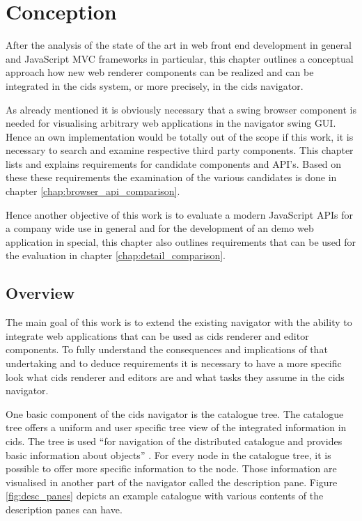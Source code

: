 \chapter{Conception}\label{chap:conception}
After the analysis of the state of the art in web front end development in general and JavaScript MVC frameworks in particular, this chapter outlines a conceptual approach how new web renderer components can be realized and can be integrated in the cids system, or more precisely, in the cids navigator.

As already mentioned it is obviously necessary that a swing browser component is needed for visualising arbitrary web applications in the navigator swing GUI.
Hence an own implementation would be totally out of the scope if this work, it is necessary to search and examine respective third party components.
This chapter lists and explains requirements for candidate components and API's.
Based on these these requirements the examination of the various candidates is done in chapter \ref{chap:browser_api_comparison}.

Hence another objective of this work is to evaluate a modern JavaScript APIs for a company wide use in general and for the development of an demo web application in special, this chapter also outlines requirements that can be used for the evaluation in chapter \ref{chap:detail_comparison}.

\section{Overview}

The main goal of this work is to extend the existing navigator with the ability to integrate web applications that can be used as cids renderer and editor components.
To fully understand the consequences and implications of that undertaking and to deduce requirements it is necessary to have a more specific look what cids renderer and editors are and what tasks they assume in the cids navigator.

One basic component of the cids navigator is the catalogue tree.
The catalogue tree offers a uniform and user specific tree view of the integrated information in cids.
The tree is used \enquote{for navigation of the distributed catalogue and provides basic information about objects} \autocite{cismet-cids-readMe}.
For every node in the catalogue tree, it is possible to offer more specific information to the node.
Those information are visualised in another part of the navigator called the description pane.
Figure \ref{fig:desc_panes} depicts an example catalogue with various contents of the description panes can have.

